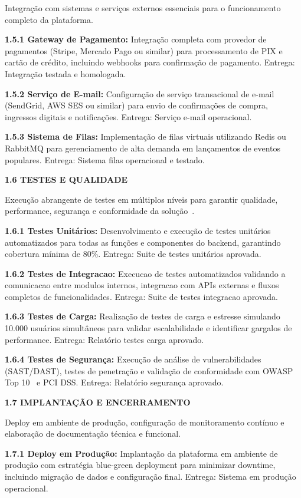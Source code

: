 Integração com sistemas e serviços externos essenciais para o funcionamento completo da plataforma.

\textbf{1.5.1 Gateway de Pagamento:} Integração completa com provedor de pagamentos (Stripe, Mercado Pago ou similar) para processamento de PIX e cartão de crédito, incluindo webhooks para confirmação de pagamento. Entrega: Integração testada e homologada.

\textbf{1.5.2 Serviço de E-mail:} Configuração de serviço transacional de e-mail (SendGrid, AWS SES ou similar) para envio de confirmações de compra, ingressos digitais e notificações. Entrega: Serviço e-mail operacional.

\textbf{1.5.3 Sistema de Filas:} Implementação de filas virtuais utilizando Redis ou RabbitMQ para gerenciamento de alta demanda em lançamentos de eventos populares. Entrega: Sistema filas operacional e testado.

\textbf{1.6 TESTES E QUALIDADE}

Execução abrangente de testes em múltiplos níveis para garantir qualidade, performance, segurança e conformidade da solução~\cite{Pressman:2019}.

\textbf{1.6.1 Testes Unitários:} Desenvolvimento e execução de testes unitários automatizados para todas as funções e componentes do backend, garantindo cobertura mínima de 80\%. Entrega: Suite de testes unitários aprovada.

\textbf{1.6.2 Testes de Integracao:} Execucao de testes automatizados validando a comunicacao entre modulos internos, integracao com APIs externas e fluxos completos de funcionalidades. Entrega: Suite de testes integracao aprovada.

\textbf{1.6.3 Testes de Carga:} Realização de testes de carga e estresse simulando 10.000 usuários simultâneos para validar escalabilidade e identificar gargalos de performance. Entrega: Relatório testes carga aprovado.

\textbf{1.6.4 Testes de Segurança:} Execução de análise de vulnerabilidades (SAST/DAST), testes de penetração e validação de conformidade com OWASP Top 10~\cite{OWASP:2021} e PCI DSS. Entrega: Relatório segurança aprovado.

\textbf{1.7 IMPLANTAÇÃO E ENCERRAMENTO}

Deploy em ambiente de produção, configuração de monitoramento contínuo e elaboração de documentação técnica e funcional.

\textbf{1.7.1 Deploy em Produção:} Implantação da plataforma em ambiente de produção com estratégia blue-green deployment para minimizar downtime, incluindo migração de dados e configuração final. Entrega: Sistema em produção operacional.

